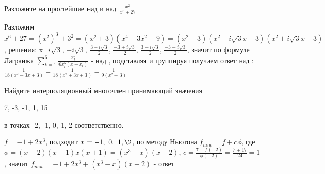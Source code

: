 \documentclass[12pt]{article}
\newenvironment{problem}[2][Problem]
{\begin{trivlist}\item[{\bfseries #1} {\bfseries #2.}]}{\end{trivlist}}
\newenvironment{solutions}[2][Solutions]
{\begin{trivlist}\item[{\bfseries #1} {\bfseries #2.}]}{\end{trivlist}}
\newenvironment{ihw}[2][ИДЗ]
{\begin{trivlist}\item[{\bfseries #1} {\bfseries #2.}]}{\end{trivlist}}
\begin{document}
\begin{problem}{6} 
Разложите на простейшие над  и над  $\frac{x^2}{x^6+27}$
\end{problem}

\begin{solutions}{6} 
Разложим $x^6+27 = (x^2)^3+3^2 = (x^2+3)(x^4-3x^2+9) = (x^2+3)(x^2 - i\sqrt3 x - 3)(x^2 + i\sqrt3x - 3)$, решения: x=$i\sqrt3$, $-i\sqrt3$, $\frac{3 + i\sqrt3}{2}$, $\frac{-3 + i\sqrt3}{2}$, $\frac{3 - i\sqrt3}{2}$, $\frac{-3 - i\sqrt3}{2}$, значит по формуле Лагранжа $\sum\limits_{k=1}^{6} \frac{x_k^2}{6x_i^5 (x-x_i)}$ - над , подставляя и группируя получаем ответ над : $\frac{1}{18 (x^2-3x+3)} + \frac{1}{18 (x^2+3x+3)} - \frac{1}{9 (x^2+3)}$
\end{solutions}

\begin{ihw}{КП} 
Найдите интерполяционный многочлен принимающий значения 
\begin{center}
7, -3, -1, 1, 15
\end{center}
в точках -2, -1, 0, 1, 2 соответственно.
\end{ihw}

\begin{solutions}{ИДЗ} 
$f=-1+2x^3$, подходит $x=-1,\ 0,\ 1,\2$, по методу Ньютона $f_{new}=f+c\phi$, где $\phi = (x-2)(x-1)x(x+1)=(x^3-x)(x-2)$, $c=\frac{7-f(-2)}{\phi(-2)}=\frac{7+17}{24}=1$, значит $f_{new}=-1+2x^3+(x^3-x)(x-2)$ - ответ
\end{solutions}
\end{document}
